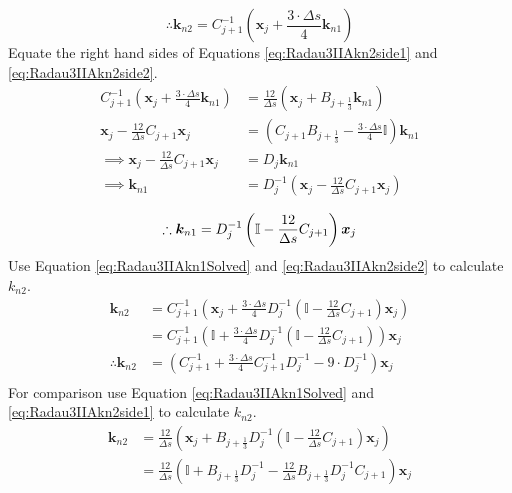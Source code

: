 \documentclass{article}
\begin{document}
\begin{equation}
  \label{eq:Radau3IIAkn2side2}
  \therefore \bm{k}_{n2} = C_{j+1}^{-1}\left(\bm{x}_j +\frac{3\cdot \Delta s}{4}\bm{k}_{n1}\right)
\end{equation}
Equate the right hand sides of Equations \ref{eq:Radau3IIAkn2side1} and \ref{eq:Radau3IIAkn2side2}.
\begin{align*}
   C_{j+1}^{-1}\left(\bm{x}_j +\frac{3\cdot \Delta s}{4}\bm{k}_{n1}\right) &= \frac{12}{\Delta s}\left(\bm{x}_j + B_{j+\frac{1}{3}}\bm{k}_{n1}\right)\\
   \bm{x}_j - \frac{12}{\Delta s}C_{j+1}\bm{x}_j &= \left(C_{j+1}B_{j+\frac{1}{3}} - \frac{3\cdot\Delta s}{4}\mathbb{I}\right)\bm{k}_{n1}\\
   \implies \bm{x}_j - \frac{12}{\Delta s}C_{j+1}\bm{x}_j &= D_j\bm{k}_{n1}\\
   \implies \bm{k}_{n1} & = D_j^{-1}\left(\bm{x}_j - \frac{12}{\Delta s}C_{j+1}\bm{x}_j\right) \\
 \end{align*}
\begin{equation}
  \label{eq:Radau3IIAkn1Solved}
   \therefore \bm{k}_{n1} = D_j^{-1}\left(\mathbb{I} - \frac{12}{\Delta s}C_{j+1}\right)\bm{x}_j \\
\end{equation}
Use Equation \ref{eq:Radau3IIAkn1Solved} and \ref{eq:Radau3IIAkn2side2} to calculate $k_{n2}$.
\begin{align*}
  \bm{k}_{n2} &= C_{j+1}^{-1}\left(\bm{x}_j +\frac{3\cdot \Delta s}{4}D_j^{-1}\left(\mathbb{I} - \frac{12}{\Delta s}C_{j+1}\right)\bm{x}_j\right)\\
  &= C_{j+1}^{-1}\left(\mathbb{I} +\frac{3\cdot \Delta s}{4}D_j^{-1}\left(\mathbb{I} - \frac{12}{\Delta s}C_{j+1}\right)\right)\bm{x}_j\\
  \therefore \bm{k}_{n2} &= \left(C_{j+1}^{-1} +\frac{3\cdot \Delta s}{4}C_{j+1}^{-1}D_j^{-1} - 9\cdot D_{j}^{-1}\right)\bm{x}_j\\
\end{align*}
For comparison use Equation \ref{eq:Radau3IIAkn1Solved} and \ref{eq:Radau3IIAkn2side1} to calculate $k_{n2}$.
\begin{align*}
  \bm{k}_{n2} &= \frac{12}{\Delta s}\left(\bm{x}_j + B_{j+\frac{1}{3}}D_{j}^{-1}\left(\mathbb{I} - \frac{12}{\Delta s}C_{j+1} \right)\bm{x}_j\right)\\
              &= \frac{12}{\Delta s}\left(\mathbb{I} + B_{j+\frac{1}{3}}D_{j}^{-1} - \frac{12}{\Delta s}B_{j+\frac{1}{3}}D_{j}^{-1}C_{j+1} \right)\bm{x}_j\\
\end{align*}
\end{document}
